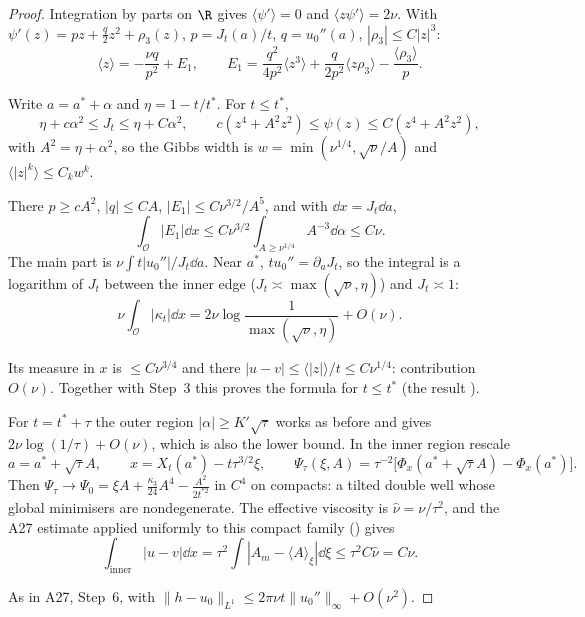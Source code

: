 \begin{proof}
Integration by parts on $\R$ gives $\langle\psi'\rangle=0$ and $\langle z\psi'\rangle=2\nu$. With $\psi'(z)=pz+\tfrac q2z^2+\rho_3(z)$, $p=J_t(a)/t$, $q=u_0''(a)$, $|\rho_3|\le C|z|^3$:
\[
\langle z\rangle=-\frac{\nu q}{p^2}+E_1,\qquad E_1=\frac{q^2}{4p^2}\langle z^3\rangle+\frac{q}{2p^2}\langle z\rho_3\rangle-\frac{\langle\rho_3\rangle}{p}.
\]

Write $a=a^*+\alpha$ and $\eta=1-t/t^*$. For $t\le t^*$,
\[
\eta+c\alpha^2\le J_t\le\eta+C\alpha^2,\qquad c(z^4+A^2z^2)\le\psi(z)\le C(z^4+A^2z^2),
\]
with $A^2=\eta+\alpha^2$, so the Gibbs width is $w=\min(\nu^{1/4},\sqrt\nu/A)$ and $\langle|z|^k\rangle\le C_kw^k$.

There $p\ge cA^2$, $|q|\le CA$, $|E_1|\le C\nu^{3/2}/A^5$, and with $\dd x=J_t\dd a$,
\[
\int_{\mathcal O}|E_1|\dd x\le C\nu^{3/2}\int_{A\ge\nu^{1/4}}A^{-3}\dd\alpha\le C\nu .
\]
The main part is $\nu\int t|u_0''|/J_t\dd a$. Near $a^*$, $tu_0''=\partial_aJ_t$, so the integral is a logarithm of $J_t$ between the inner edge ($J_t\asymp\max(\sqrt\nu,\eta)$) and $J_t\asymp1$:
\[
\nu\int_{\mathcal O}|\kappa_t|\dd x=2\nu\log\frac{1}{\max(\sqrt\nu,\eta)}+O(\nu).
\]

Its measure in $x$ is $\le C\nu^{3/4}$ and there $|u-v|\le\langle|z|\rangle/t\le C\nu^{1/4}$: contribution $O(\nu)$. Together with Step~3 this proves the formula for $t\le t^*$ (the result ).

For $t=t^*+\tau$ the outer region $|\alpha|\ge K'\sqrt\tau$ works as before and gives $2\nu\log(1/\tau)+O(\nu)$, which is also the lower bound. In the inner region rescale
\[
a=a^*+\sqrt\tau A,\qquad x=X_t(a^*)-t\tau^{3/2}\xi,\qquad \Psi_\tau(\xi,A)=\tau^{-2}\big[\Phi_x(a^*+\sqrt\tau A)-\Phi_x(a^*)\big].
\]
Then $\Psi_\tau\to\Psi_0=\xi A+\frac{\kappa_3}{24}A^4-\frac{A^2}{2t^{*2}}$ in $C^4$ on compacts: a tilted double well whose global minimisers are nondegenerate. The effective viscosity is $\hat\nu=\nu/\tau^2$, and the A27 estimate applied uniformly to this compact family () gives
\[
\int_{\mathrm{inner}}|u-v|\dd x=\tau^2\int|A_m-\langle A\rangle_\xi|\dd\xi\le\tau^2C\hat\nu=C\nu .
\]

As in A27, Step~6, with $\|h-u_0\|_{L^1}\le2\pi\nu t\|u_0''\|_\infty+O(\nu^2)$.

\end{proof}


